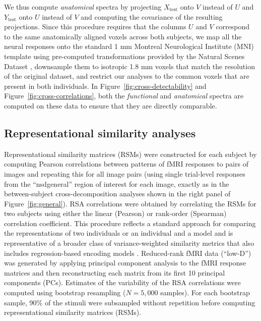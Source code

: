 \documentclass[10pt]{article}
\begin{document}
We thus compute \emph{anatomical} spectra by projecting \(X_\text{test}\) onto \(V\) instead of \(U\) and \(Y_\text{test}\) onto \(U\) instead of \(V\) and computing the covariance of the resulting projections. Since this procedure requires that the columns \(U\) and \(V\) correspond to the same anatomically aligned voxels across both subjects, we map all the neural responses onto the standard 1 mm Montreal Neurological Institute (MNI) template using pre-computed transformations provided by the Natural Scenes Dataset \autocite{Allen2021}, downsample them to isotropic 1.8 mm voxels that match the resolution of the original dataset, and restrict our analyses to the common voxels that are present in both individuals. In Figure~\ref{fig:cross-detectability} and Figure~\ref{fig:cross-correlations}, both the \emph{functional} and \emph{anatomical} spectra are computed on these data to ensure that they are directly comparable.

\subsection{Representational similarity analyses}\label{representational-similarity-analyses}

Representational similarity matrices (RSMs) were constructed for each subject by computing Pearson correlations between patterns of fMRI responses to pairs of images and repeating this for all image pairs (using single trial-level responses from the ``nsdgeneral'' region of interest for each image, exactly as in the between-subject cross-decomposition analyses shown in the right panel of Figure~\ref{fig:general}). RSA correlations were obtained by correlating the RSMs for two subjects using either the linear (Pearson) or rank-order (Spearman) correlation coefficient. This procedure reflects a standard approach for comparing the representations of two individuals or an individual and a model and is representative of a broader class of variance-weighted similarity metrics that also includes regression-based encoding models \autocite{Kriegeskorte2019,Kornblith2019}. Reduced-rank fMRI data (``low-D'') was generated by applying principal component analysis to the fMRI response matrices and then reconstructing each matrix from its first 10 principal components (PCs). Estimates of the variability of the RSA correlations were computed using bootstrap resampling (\(N = 5,000\) samples). For each bootstrap sample, 90\% of the stimuli were subsampled without repetition before computing representational similarity matrices (RSMs).
\end{document}
